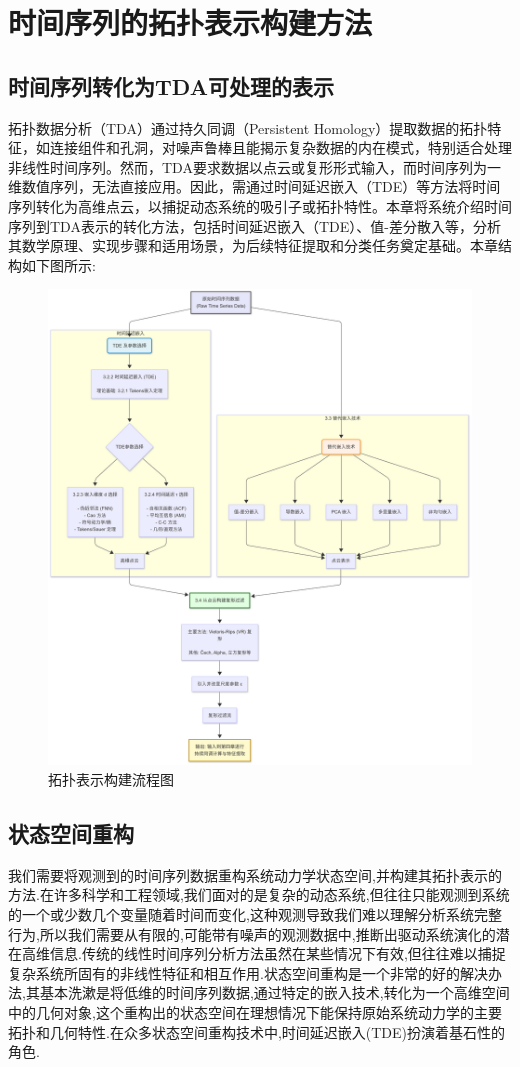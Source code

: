 \section{时间序列的拓扑表示构建方法}
\subsection{时间序列转化为TDA可处理的表示}
拓扑数据分析（TDA）通过持久同调（Persistent Homology）提取数据的拓扑特征，如连接组件和孔洞，对噪声鲁棒且能揭示复杂数据的内在模式，特别适合处理非线性时间序列。然而，TDA要求数据以点云或复形形式输入，而时间序列为一维数值序列，无法直接应用。因此，需通过时间延迟嵌入（TDE）等方法将时间序列转化为高维点云，以捕捉动态系统的吸引子或拓扑特性。本章将系统介绍时间序列到TDA表示的转化方法，包括时间延迟嵌入（TDE）、值-差分散入等，分析其数学原理、实现步骤和适用场景，为后续特征提取和分类任务奠定基础。本章结构如下图所示:
\begin{figure}[thbp!]
    \centering
    \includegraphics[width=.9\textwidth]{figure/第三章.png}
    \caption{拓扑表示构建流程图}
\end{figure}
 
\subsection{状态空间重构}
我们需要将观测到的时间序列数据重构系统动力学状态空间,并构建其拓扑表示的方法.在许多科学和工程领域,我们面对的是复杂的动态系统,但往往只能观测到系统的一个或少数几个变量随着时间而变化,这种观测导致我们难以理解分析系统完整行为,所以我们需要从有限的,可能带有噪声的观测数据中,推断出驱动系统演化的潜在高维信息.传统的线性时间序列分析方法虽然在某些情况下有效,但往往难以捕捉复杂系统所固有的非线性特征和相互作用.状态空间重构是一个非常的好的解决办法,其基本洗漱是将低维的时间序列数据,通过特定的嵌入技术,转化为一个高维空间中的几何对象,这个重构出的状态空间在理想情况下能保持原始系统动力学的主要拓扑和几何特性.在众多状态空间重构技术中,时间延迟嵌入(TDE)扮演着基石性的角色.
